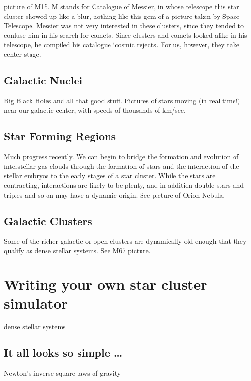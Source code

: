 \documentclass{book}
\begin{document}
picture of M15.  M stands for Catalogue of Messier, in whose telescope
this star cluster showed up like a blur, nothing like this gem of a
picture taken by Space Telescope.  Messier was not very interested in
these clusters, since they tended to confuse him in his search for
comets.  Since clusters and comets looked alike in his telescope, he
compiled his catalogue `cosmic rejects'.  For us, however, they take
center stage.

\subsection{Galactic Nuclei}

Big Black Holes and all that good stuff.  Pictures of stars moving (in
real time!) near our galactic center, with speeds of thousands of km/sec.

\subsection{Star Forming Regions}

Much progress recently.  We can begin to bridge the formation and
evolution of interstellar gas clouds through the formation of stars
and the interaction of the stellar embryos to the early stages of a
star cluster.  While the stars are contracting, interactions are
likely to be plenty, and in addition double stars and triples and so
on may have a dynamic origin.  See picture of Orion Nebula.

\subsection{Galactic Clusters}

Some of the richer galactic or open clusters are dynamically old
enough that they qualify as dense stellar systems.  See M67 picture.

\newpage

\section{Writing your own star cluster simulator}

dense stellar systems

\subsection{It all looks so simple \dots}

Newton's inverse square laws of gravity
\end{document}
